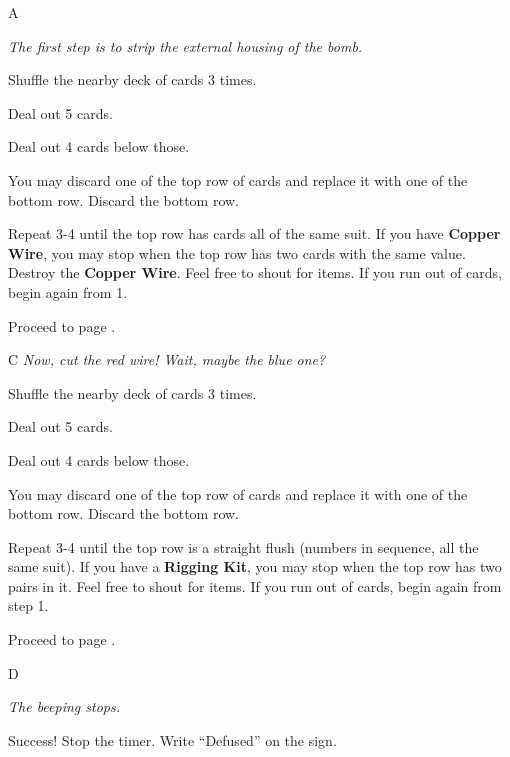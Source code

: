 \documentclass[notebook]{airship}
\begin{document}
\begin{page}{A}

{\it The first step is to strip the external housing of the bomb.}

\begin{enum}
\item Shuffle the nearby deck of cards 3 times. 
\item Deal out 5 cards.
\item Deal out 4 cards below those.
\item You may discard one of the top row of cards and replace it with one of the bottom row. Discard the bottom row.
\item Repeat 3-4 until the top row has cards all of the same suit. If you have {\bf Copper Wire}, you may stop when the top row has two cards with the same value. Destroy the {\bf Copper Wire}. Feel free to shout for items. If you run out of cards, begin again from 1. 
\item Proceed to page .
\end{enum}
 
\end{page}



\begin{page}{C}
{\it Now, cut the red wire! Wait, maybe the blue one?}

\begin{enum}
\item Shuffle the nearby deck of cards 3 times. 
\item Deal out 5 cards.
\item Deal out 4 cards below those.
\item You may discard one of the top row of cards and replace it with one of the bottom row. Discard the bottom row.
\item Repeat 3-4 until the top row is a straight flush (numbers in sequence, all the same suit). If you have a {\bf Rigging Kit}, you may stop when the top row has two pairs in it. Feel free to shout for items. If you run out of cards, begin again from step 1. 
\item Proceed to page .
\end{enum}


\end{page}



\begin{page}{D}

{\it The beeping stops.}

Success! Stop the timer. Write ``Defused'' on the sign. 

\end{page}

\endnotebook
\end{document}
